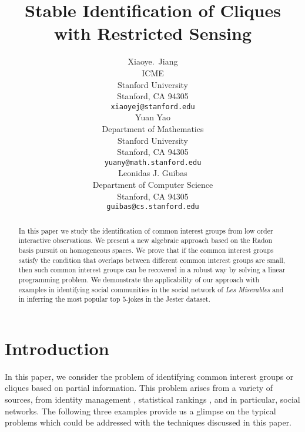 \documentclass{article}
\title{Stable Identification of Cliques with Restricted Sensing}
\author{
Xiaoye.~Jiang%
\\
ICME \\
Stanford University \\
Stanford, CA 94305 \\
\texttt{xiaoyej@stanford.edu} \\
\And
Yuan Yao \\
Department of Mathematics \\
Stanford University\\
Stanford, CA 94305 \\
\texttt{yuany@math.stanford.edu} \\
\AND
Leonidas J. Guibas \\
Department of Computer Science\\
Stanford, CA 94305 \\
\texttt{guibas@cs.stanford.edu} \\
}
\begin{document}
\maketitle

\begin{abstract}
In this paper we study the identification of common interest groups from low order interactive observations. 
We present a new algebraic approach based on the Radon basis pursuit on homogeneous spaces.  
We prove that if the common interest groups satisfy the condition that overlaps between different common 
interest groups are small, then such common interest groups can be recovered in a robust way by solving a 
linear programming problem. We demonstrate the applicability of our approach with examples 
in identifying social communities in the social network of {\sl Les Miserables} and in inferring the most
popular top $5$-jokes in the Jester dataset.



\end{abstract}



\section{Introduction}

In this paper, we consider the problem of identifying common interest
groups or cliques based on partial information. This problem arises from a variety of 
sources, from identity management \cite{Guibas08}, statistical rankings \cite{Persi88, JagSha08}, and in particular, social networks. The following three examples provide us a glimpse on the typical problems which could be addressed with the techniques discussed in this paper. 
\end{document}
